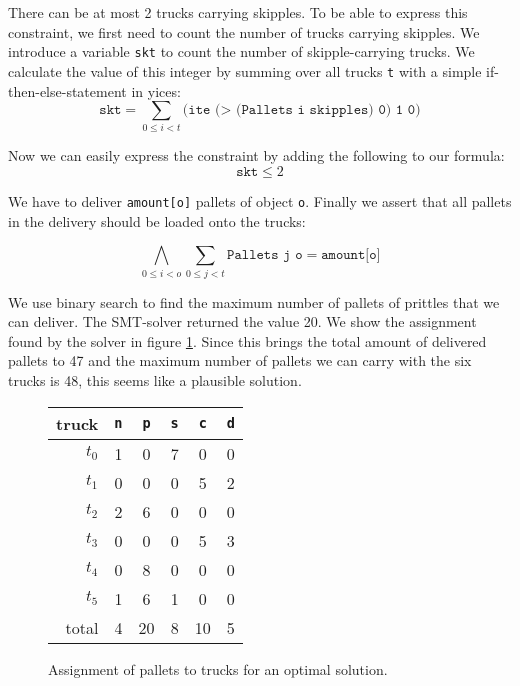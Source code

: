 \documentclass[12pt]{article}
\begin{document}
There can be at most 2 trucks carrying skipples. To be able to express this constraint, we first need to count the number of trucks carrying skipples. We introduce a variable \texttt{skt} to count the number of skipple-carrying trucks. We calculate the value of this integer by summing over all trucks \texttt{t} with a simple if-then-else-statement in yices: 
\[ \texttt{skt} = \sum_{0\le i < t} \texttt{(ite (> (Pallets i skipples) 0) 1 0)}\]

Now we can easily express the constraint by adding the following to our formula:
\[ \texttt{skt} \le 2 \]

We have to deliver \texttt{amount[o]} pallets of object \texttt{o}. Finally we assert that all pallets in the delivery should be loaded onto the trucks:

\[ \bigwedge_{0 \le i < o} \sum_{0 \le j < t} \texttt{Pallets j o} = \texttt{amount[o]}\]

We use binary search to find the maximum number of pallets of prittles that we can deliver.
The SMT-solver returned the value 20.
We show the assignment found by the solver in figure \ref{fig:sub1table}.
Since this brings the total amount of delivered pallets to 47 and the maximum number of pallets we can carry with the six trucks is 48, this seems like a plausible solution.

\begin{figure}[h]
    \begin{center}
        \begin{tabular}{r|ccccc}
        truck & \texttt{n} & \texttt{p} & \texttt{s} & \texttt{c} & \texttt{d} \\\hline
        $t_0$ & 1 & 0 & 7 & 0 & 0 \\
        $t_1$ & 0 & 0 & 0 & 5 & 2 \\
        $t_2$ & 2 & 6 & 0 & 0 & 0 \\
        $t_3$ & 0 & 0 & 0 & 5 & 3 \\
        $t_4$ & 0 & 8 & 0 & 0 & 0 \\
        $t_5$ & 1 & 6 & 1 & 0 & 0 \\\hline
        total & 4 & 20 & 8 & 10 & 5 \\
        \end{tabular}
    \end{center}
    \caption{Assignment of pallets to trucks for an optimal solution.}
    \label{fig:sub1table}
\end{figure}
\end{document}

